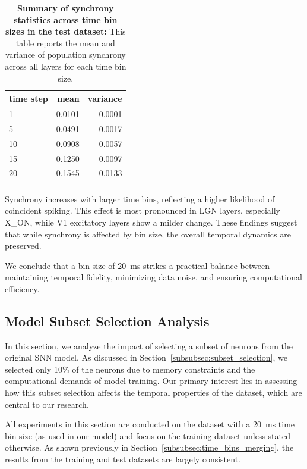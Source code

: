 \begin{table}
    \centering\footnotesize\sf
    \begin{tabular}{lrr}
    \toprule
    time step & mean & variance \\
    \midrule
    1 & 0.0101 & 0.0001 \\
    5 & 0.0491 & 0.0017 \\
    10 & 0.0908 & 0.0057 \\
    15 & 0.1250 & 0.0097 \\
    20 & 0.1545 & 0.0133 \\
    \addlinespace %
    \bottomrule
    \end{tabular}
    \caption{\textbf{Summary of synchrony statistics across time bin sizes in the test dataset:} This table reports the mean and variance of population synchrony across all layers for each time bin size.}
    \label{tab:synchrony_time_bins_summary_test}
\end{table}

Synchrony increases with larger time bins, reflecting a higher likelihood of coincident spiking. This effect is most pronounced in LGN layers, especially X\_ON, while V1 excitatory layers show a milder change. These findings suggest that while synchrony is affected by bin size, the overall temporal dynamics are preserved.

We conclude that a bin size of 20~ms strikes a practical balance between maintaining temporal fidelity, minimizing data noise, and ensuring computational efficiency.


\subsection{Model Subset Selection Analysis}
\label{subsec:subset_selection_analysis}

In this section, we analyze the impact of selecting a subset of neurons from the original SNN model. As discussed in Section~\ref{subsubsec:subset_selection}, we selected only 10\% of the neurons due to memory constraints and the computational demands of model training. Our primary interest lies in assessing how this subset selection affects the temporal properties of the dataset, which are central to our research.

All experiments in this section are conducted on the dataset with a 20~ms time bin size (as used in our model) and focus on the training dataset unless stated otherwise. As shown previously in Section~\ref{subsubsec:time_bins_merging}, the results from the training and test datasets are largely consistent.

